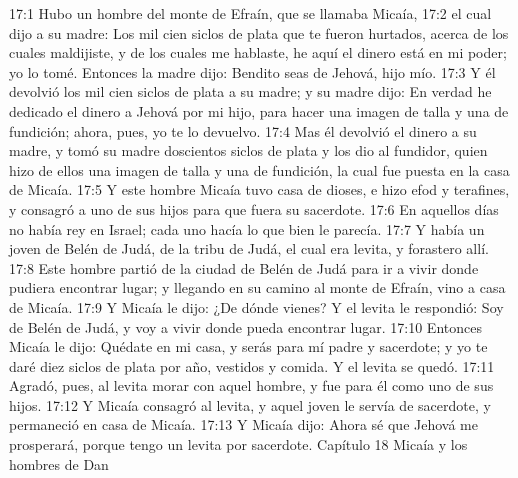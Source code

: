 17:1 Hubo un hombre del monte de Efraín, que se llamaba Micaía,  
17:2 el cual dijo a su madre: Los mil cien siclos de plata   que te fueron hurtados, acerca de los cuales maldijiste, y de los cuales me hablaste, he aquí el dinero está en mi poder; yo lo tomé. Entonces la madre dijo: Bendito seas de Jehová, hijo mío.  
17:3 Y él devolvió los mil cien siclos de plata   a su madre; y su madre dijo: En verdad he dedicado el dinero a Jehová por mi hijo, para hacer una imagen de talla y una de fundición; ahora, pues, yo te lo devuelvo.  
17:4 Mas él devolvió el dinero a su madre, y tomó su madre doscientos siclos de plata   y los dio al fundidor, quien hizo de ellos una imagen de talla y una de fundición, la cual fue puesta en la casa de Micaía.  
17:5 Y este hombre Micaía tuvo casa de dioses, e hizo efod y terafines, y consagró a uno de sus hijos para que fuera su sacerdote.  
17:6 En aquellos días no había rey en Israel; cada uno hacía lo que bien le parecía. 
17:7 Y había un joven de Belén de Judá, de la tribu de Judá, el cual era levita, y forastero allí.  
17:8 Este hombre partió de la ciudad de Belén de Judá para ir a vivir donde pudiera encontrar lugar; y llegando en su camino al monte de Efraín, vino a casa de Micaía.  
17:9 Y Micaía le dijo: ¿De dónde vienes? Y el levita le respondió: Soy de Belén de Judá, y voy a vivir donde pueda encontrar lugar.  
17:10 Entonces Micaía le dijo: Quédate en mi casa, y serás para mí padre y sacerdote; y yo te daré diez siclos de plata   por año, vestidos y comida. Y el levita se quedó. 
17:11 Agradó, pues, al levita morar con aquel hombre, y fue para él como uno de sus hijos.  
17:12 Y Micaía consagró al levita, y aquel joven le servía de sacerdote, y permaneció en casa de Micaía.  
17:13 Y Micaía dijo: Ahora sé que Jehová me prosperará, porque tengo un levita por sacerdote.  
Capítulo 18
Micaía y los hombres de Dan  

